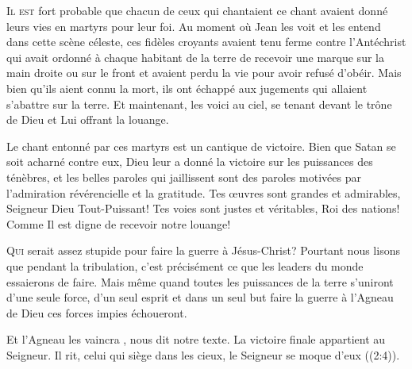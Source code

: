 \lettrine{I}{l est} fort probable que chacun de ceux qui chantaient
 ce chant avaient donné leurs vies en martyrs pour leur foi.
 Au moment où Jean les voit et les entend dans cette scène céleste,
 ces fidèles croyants avaient tenu ferme contre l'Antéchrist
 \ocadr qui avait ordonné à chaque habitant de la terre de recevoir
 une marque sur la main droite ou sur le front \fcadr{}
 et avaient perdu la vie pour avoir refusé d'obéir.
 Mais bien qu'ils aient connu la mort, ils ont échappé aux jugements
 qui allaient s'abattre sur la terre. Et maintenant, les voici au ciel,
 se tenant devant le trône de Dieu et Lui offrant la louange.

Le chant entonné par ces martyrs est un cantique de victoire.
 Bien que Satan se soit acharné contre eux, Dieu leur a donné la victoire
 sur les puissances des ténèbres, et les belles paroles qui jaillissent
 sont des paroles motivées par l'admiration révérencielle et la gratitude.
 \og Tes œuvres sont grandes et admirables, Seigneur Dieu Tout-Puissant!
 Tes voies sont justes et véritables, Roi des nations! \fg{}
 Comme Il est digne de recevoir notre louange!


\dvrule






\lettrine{Q}{ui} serait assez stupide pour faire la guerre à Jésus-Christ?
 Pourtant nous lisons que pendant la tribulation,
 c'est précisément ce que les leaders du monde essaierons de faire.
 Mais même quand toutes les puissances de la terre s'uniront d'une seule force,
 d'un seul esprit et dans un seul but
 \ocadr faire la guerre à l'Agneau de Dieu \fcadr{}
 ces forces impies échoueront.

\og Et l'Agneau les vaincra \fg{}, 
 nous dit notre texte. La victoire finale appartient au Seigneur.
 \og Il rit, celui qui siège dans les cieux, le Seigneur se moque d'eux \fg{}
 ((2:4)).

